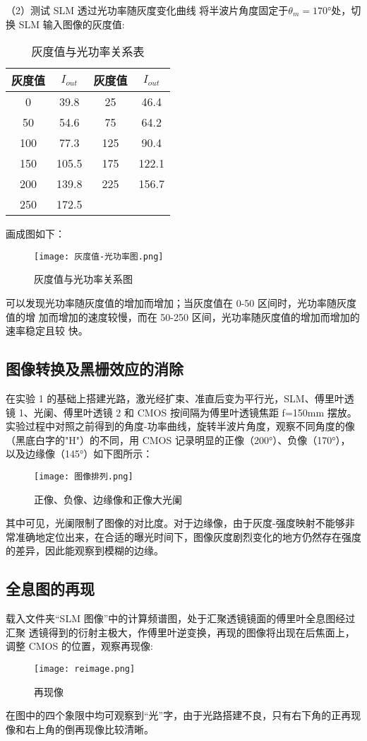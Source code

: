\documentclass{whureport}
\begin{document}
\begin{multicols}{2}
（2）测试 SLM 透过光功率随灰度变化曲线
将半波片角度固定于$\theta_m=170°$处，切换 SLM 输入图像的灰度值:
\begin{table}[H]
    \centering
\begin{tabular}{|c|c|c|c|}
\hline
灰度值 & $I_{out}$ & 灰度值 & $I_{out}$ \\
\hline
0 & 39.8 & 25 & 46.4 \\
\hline
50 & 54.6 & 75 & 64.2 \\
\hline
100 & 77.3 & 125 & 90.4 \\
\hline
150 & 105.5 & 175 & 122.1 \\
\hline
200 & 139.8 & 225 & 156.7 \\
\hline
250 & 172.5 &  &  \\
\hline
\end{tabular}

    \caption{灰度值与光功率关系表}
    \label{tab:gray-power-relation}
    \end{table}
画成图如下：
    \begin{figure}[H]
        \centering
        \texttt{[image: 灰度值-光功率图.png]}
        \caption{灰度值与光功率关系图}
        \label{fig:gray-power-relation}
        \end{figure}
        可以发现光功率随灰度值的增加而增加；当灰度值在 0-50 区间时，光功率随灰度值的增
        加而增加的速度较慢，而在 50-250 区间，光功率随灰度值的增加而增加的速率稳定且较
        快。
\subsection{图像转换及黑栅效应的消除}
在实验 1 的基础上搭建光路，激光经扩束、准直后变为平行光，SLM、傅里叶透镜
1、光阑、傅里叶透镜 2 和 CMOS 按间隔为傅里叶透镜焦距 f=150mm 摆放。
实验过程中对照之前得到的角度-功率曲线，旋转半波片角度，观察不同角度的像（黑底白字的"H"）的不同，用 CMOS 记录明显的正像（200°）、负像（170°），
以及边缘像（145°）如下图所示：
\begin{figure}[H]
    \centering
    \texttt{[image: 图像排列.png]}
    \caption{正像、负像、边缘像和正像大光阑}
    \label{fig:image-arrangement}
    \end{figure}
其中可见，光阑限制了图像的对比度。对于边缘像，由于灰度-强度映射不能够非常准确地定位出来，在合适的曝光时间下，图像灰度剧烈变化的地方仍然存在强度的差异，因此能观察到模糊的边缘。

\subsection{全息图的再现}
载入文件夹“SLM 图像”中的计算频谱图，处于汇聚透镜镜面的傅里叶全息图经过汇聚
透镜得到的衍射主极大，作傅里叶逆变换，再现的图像将出现在后焦面上，调整 CMOS 的位置，观察再现像:
\begin{figure}[H]
    \centering
    \texttt{[image: reimage.png]}
    \caption{再现像}
    \label{fig:reproduced-image}
    \end{figure}
在图中的四个象限中均可观察到“光”字，由于光路搭建不良，只有右下角的正再现像和右上角的倒再现像比较清晰。

\end{multicols}
\end{document}
